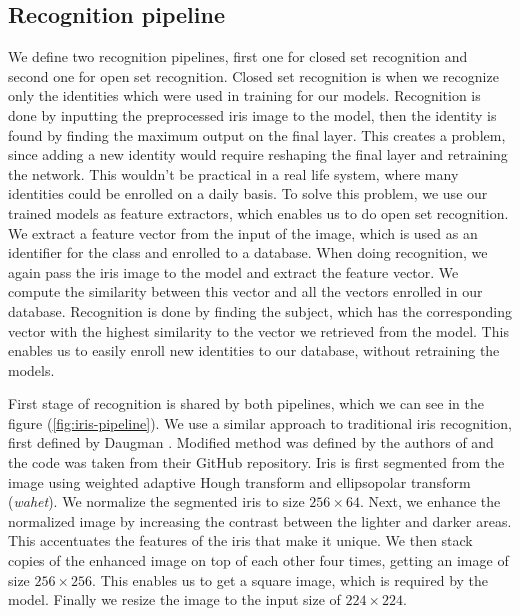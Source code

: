 \documentclass[9pt]{IEEEtran}
\begin{document}
\subsection{Recognition pipeline}
We define two recognition pipelines, first one for closed set recognition and second one for open set recognition. Closed set recognition is when we recognize only the identities which were used in training for our models. Recognition is done by inputting the preprocessed iris image to the model, then the identity is found by finding the maximum output on the final layer. This creates a problem, since adding a new identity would require reshaping the final layer and retraining the network. This wouldn't be practical in a real life system, where many identities could be enrolled on a daily basis. To solve this problem, we use our trained models as feature extractors, which enables us to do open set recognition. We extract a feature vector from the input of the image, which is used as an identifier for the class and enrolled to a database. When doing recognition, we again pass the iris image to the model and extract the feature vector. We compute the similarity between this vector and all the vectors enrolled in our database. Recognition is done by finding the subject, which has the corresponding vector with the highest similarity to the vector we retrieved from the model. This enables us to easily enroll new identities to our database, without retraining the models.

First stage of recognition is shared by both pipelines, which we can see in the figure (\ref{fig:iris-pipeline}). We use a similar approach to traditional iris recognition, first defined by Daugman \cite{daugman2009iris}. Modified method was defined by the authors of \cite{USIT2} and the code was taken from their GitHub repository. Iris is first segmented from the image using weighted adaptive Hough transform and ellipsopolar transform (\textit{wahet}). We normalize the segmented iris to size $256\times64$. Next, we enhance the normalized image by increasing the contrast between the lighter and darker areas. This accentuates the features of the iris that make it unique. We then stack copies of the enhanced image on top of each other four times, getting an image of size $256\times256$. This enables us to get a square image, which is required by the model. Finally we resize the image to the input size of $224\times224$.
\end{document}
